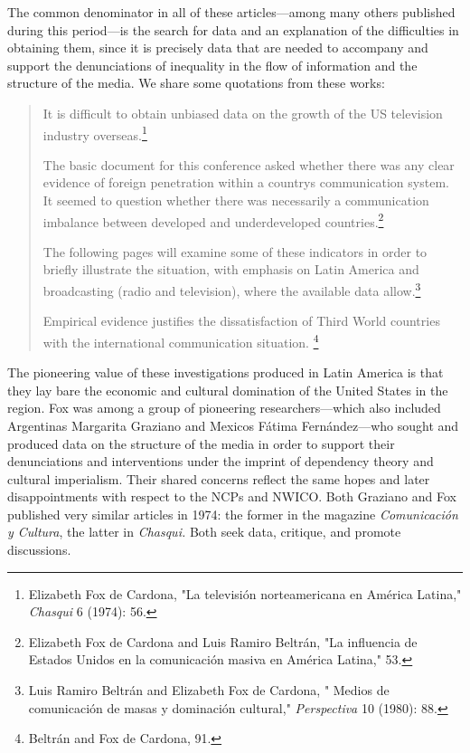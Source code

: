 \documentclass{tufte-handout}
\begin{document}
The common denominator in all of these articles---among many others
published during this period---is the search for data and an explanation
of the difficulties in obtaining them, since it is precisely data that
are needed to accompany and support the denunciations of inequality in
the flow of information and the structure of the media. We share some
quotations from these works:

\begin{quote}
It is difficult to obtain unbiased data on the growth of the US
television industry overseas.\footnote{Elizabeth Fox de Cardona, "La
  televisión norteamericana en América Latina," \emph{Chasqui} 6 (1974):
  56.}

The basic document for this conference asked whether there was any clear
evidence of foreign penetration within a country\textquotesingle s
communication system. It seemed to question whether there was
necessarily a communication imbalance between developed and
underdeveloped countries.\footnote{Elizabeth Fox de Cardona and Luis
  Ramiro Beltrán, "La influencia de Estados Unidos en la comunicación
  masiva en América Latina," 53.}

The following pages will examine some of these indicators in order to
briefly illustrate the situation, with emphasis on Latin America and
broadcasting (radio and television), where the available data
allow.\footnote{Luis Ramiro Beltrán and Elizabeth Fox de Cardona, "
  Medios de comunicación de masas y dominación cultural,"
  \emph{Perspectiva} 10 (1980): 88.}

Empirical evidence justifies the dissatisfaction of Third World
countries with the international communication situation. \footnote{Beltrán
  and Fox de Cardona, 91.}
\end{quote}

\noindent The pioneering value of these investigations produced in Latin America
is that they lay bare the economic and cultural domination of the United
States in the region. Fox was among a group of pioneering
researchers---which also included Argentina\textquotesingle s Margarita
Graziano and Mexico\textquotesingle s Fátima Fernández---who sought and
produced data on the structure of the media in order to support their
denunciations and interventions under the imprint of dependency theory
and cultural imperialism. Their shared concerns reflect the same hopes
and later disappointments with respect to the NCPs and NWICO. Both
Graziano and Fox published very similar articles in 1974: the former in
the magazine \emph{Comunicación y Cultura}, the latter in
\emph{Chasqui.} Both seek data, critique, and promote discussions.
\end{document}

